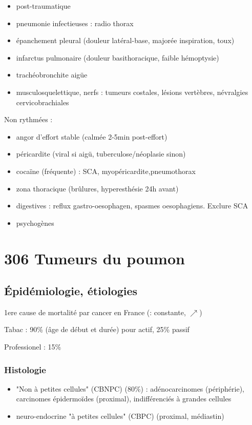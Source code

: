 \documentclass{book}
\begin{document}
\begin{itemize}
\item post-traumatique
\item pneumonie infectieuses : radio thorax
\item épanchement pleural (douleur latéral-base, majorée inspiration, toux)
\item infarctus pulmonaire (douleur basithoracique, faible hémoptysie)
\item trachéobronchite aigüe
\item musculosquelettique, nerfs : tumeurs costales, lésions vertèbres,
névralgies cervicobrachiales
\end{itemize}

Non rythmées :

\begin{itemize}
\item angor d'effort stable (calmée 2-5min post-effort)
\item péricardite (viral si aigü, tuberculose/néoplasie sinon)
\item cocaïne (fréquente) : SCA, myopéricardite,pneumothorax
\item zona thoracique (brûlures, hyperesthésie 24h avant)
\item digestives : reflux gastro-oesophagen, spasmes oesophagiens. Exclure SCA
\faBomb
\item psychogènes
\end{itemize}

\section{306 \textdagger{} Tumeurs du poumon}
\label{sec:org38aa8a9}
\label{sec:306_tumeurs_du_poumon}

\subsection{Épidémiologie, étiologies}
\label{sec:orgc46dda3}
1ere cause de mortalité par cancer en France (\male : constante, \female
\(\nearrow\))

Tabac : 90\% (âge de début et durée) pour actif, 25\% passif

Professionel : 15\%

\subsubsection{Histologie}
\label{sec:orgc4e82b6}

\begin{itemize}
\item "Non à petites cellules" (CBNPC) (80\%) : adénocarcinomes (périphérie),
carcinomes épidermoïdes (proximal), indifférenciés à grandes cellules
\item neuro-endocrine "à petites cellules" (CBPC) (proximal, médiastin)
\end{itemize}
\end{document}
